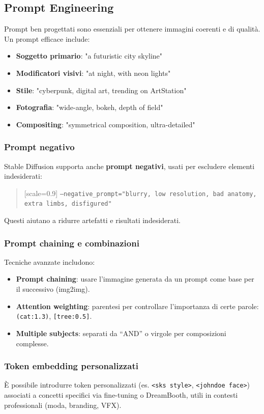 \subsection*{Prompt Engineering}

Prompt ben progettati sono essenziali per ottenere immagini coerenti e di qualità. Un prompt efficace include:

\begin{itemize}
    \item \textbf{Soggetto primario}: "a futuristic city skyline"
    \item \textbf{Modificatori visivi}: "at night, with neon lights"
    \item \textbf{Stile}: "cyberpunk, digital art, trending on ArtStation"
    \item \textbf{Fotografia}: "wide-angle, bokeh, depth of field"
    \item \textbf{Compositing}: "symmetrical composition, ultra-detailed"
\end{itemize}

\subsubsection*{Prompt negativo}

Stable Diffusion supporta anche \textbf{prompt negativi}, usati per escludere elementi indesiderati:

\begin{quote}[scale=0.9]
    \texttt{--negative\_prompt="blurry, low resolution, bad anatomy, extra limbs, disfigured"}
\end{quote}

Questi aiutano a ridurre artefatti e risultati indesiderati.

\subsubsection*{Prompt chaining e combinazioni}

Tecniche avanzate includono:
\begin{itemize}
    \item \textbf{Prompt chaining}: usare l’immagine generata da un prompt come base per il successivo (img2img).
    \item \textbf{Attention weighting}: parentesi per controllare l'importanza di certe parole: \texttt{(cat:1.3)}, \texttt{[tree:0.5]}.
    \item \textbf{Multiple subjects}: separati da “AND” o virgole per composizioni complesse.
\end{itemize}

\subsubsection*{Token embedding personalizzati}

È possibile introdurre token personalizzati (es. \texttt{<sks style>}, \texttt{<johndoe face>}) associati a concetti specifici via fine-tuning o DreamBooth, utili in contesti professionali (moda, branding, VFX).